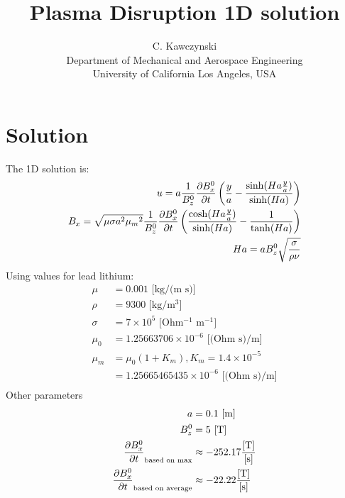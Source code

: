 \documentclass[11pt]{article}
\begin{document}
\doublespacing
\title{Plasma Disruption 1D solution}
\author{C. Kawczynski \\
Department of Mechanical and Aerospace Engineering \\
University of California Los Angeles, USA\\
}
\maketitle

\section{Solution}
The 1D solution is:
\begin{equation}\begin{aligned}
u   = a \frac{1}{B_z^0} \frac{\partial B_x^0}{\partial t}  \left( \frac{y}{a} - \frac{\sinh(Ha \frac{y}{a})}{\sinh(Ha)} \right) \\
B_x = \sqrt{\mu \sigma a^2 {\mu_m}^2} \frac{1}{B_z^0} \frac{\partial B_x^0}{\partial t} \left( \frac{\cosh(Ha \frac{y}{a})}{\sinh(Ha)} - \frac{1}{\tanh(Ha)} \right) \\
Ha = a B_z^0 \sqrt{\frac{\sigma}{\rho \nu}} \\
\end{aligned} \end{equation}
Using values for lead lithium:
\begin{equation}\begin{aligned}
\mu    & = 0.001 \text{ [kg/(m s)]} \\
\rho   & = 9300 \text{ [kg/m$^3$]} \\
\sigma & = 7 \times 10^5 \text{ [Ohm$^{-1}$ m$^{-1}$]} \\
\mu_0  & = 1.25663706    \times 10^{-6} \text{ [(Ohm s)/m]} \\
\mu_m  & = \mu_0 (1+K_m), K_m = 1.4 \times 10^{-5} \\
       & = 1.25665465435 \times 10^{-6} \text{ [(Ohm s)/m]} \\
\end{aligned} \end{equation}
Other parameters
\begin{equation}\begin{aligned}
a                       & = 0.1 \text{ [m]}\\
B_z^0                   & = 5 \text{ [T]}\\
\frac{\partial B_x^0}{\partial t}_{\text{based on max}} & \approx -252.17 \frac{\text{[T]}}{\text{[s]}} \\
\frac{\partial B_x^0}{\partial t}_{\text{based on average}} & \approx -22.22 \frac{\text{[T]}}{\text{[s]}} \\
\end{aligned} \end{equation}
\end{document}
